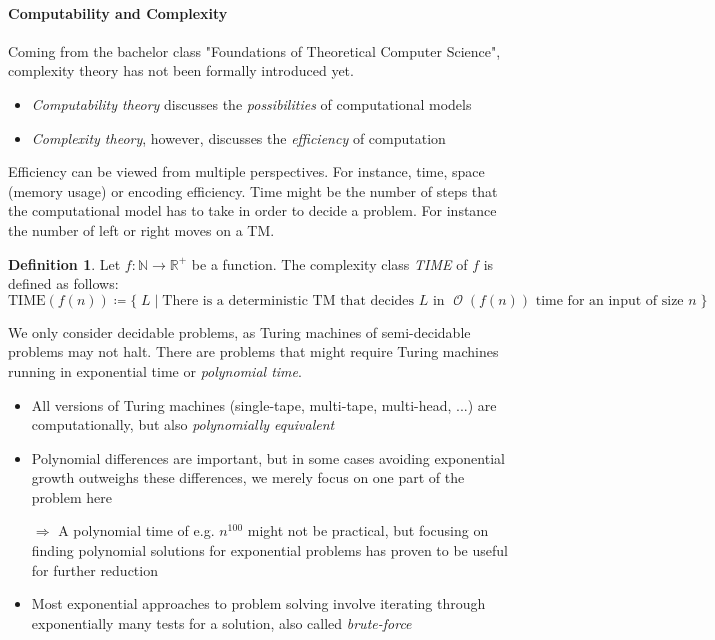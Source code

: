 \documentclass[10pt,fleqn]{article}
\theoremstyle{definition}
\newtheorem{definition}{Definition}
\theoremstyle{remark}
\DeclareMathOperator{\onot}{\mathcal{O}}
\begin{document}
\paragraph{Computability and Complexity} Coming from the bachelor class "Foundations of Theoretical Computer Science", complexity theory has not been formally introduced yet.
\begin{itemize}
    \item \emph{Computability theory} discusses the \emph{possibilities} of computational models
    \item \emph{Complexity theory}, however, discusses the \emph{efficiency} of computation
\end{itemize}
Efficiency can be viewed from multiple perspectives. For instance, time, space (memory usage) or encoding efficiency. Time might be the number of steps that the computational model has to take in order to decide a problem. For instance the number of left or right moves on a TM.
\begin{definition}
    Let \(f\colon \mathbb{N} \rightarrow \mathbb{R}^+\) be a function. The complexity class \emph{TIME} of \(f\) is defined as follows:
    \[
        \text{TIME}(f(n)) \coloneqq \{ \; L \mid \text{There is a deterministic TM that decides } L \text{ in } \onot{(f(n))} \text{ time for an input of size } n \; \}
    \]
\end{definition}
We only consider decidable problems, as Turing machines of semi-decidable problems may not halt. There are problems that might require Turing machines running in exponential time or \emph{polynomial time}.
\begin{itemize}
    \item All versions of Turing machines (single-tape, multi-tape, multi-head, ...) are computationally, but also \emph{polynomially equivalent}
    \item Polynomial differences are important, but in some cases avoiding exponential growth outweighs these differences, we merely focus on one part of the problem here
    \item[\(\Rightarrow\)] A polynomial time of e.g. \(n^{100}\) might not be practical, but focusing on finding polynomial solutions for exponential problems has proven to be useful for further reduction
    \item Most exponential approaches to problem solving involve iterating through exponentially many tests for a solution, also called \emph{brute-force}
\end{itemize}
\end{document}
